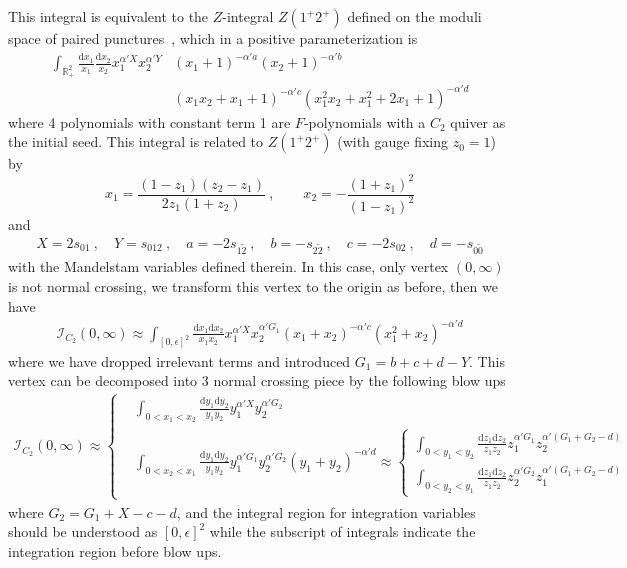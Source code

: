 \documentclass[12pt]{article}
\theoremstyle{definition}
\theoremstyle{plain}
\newcommand{\dif}{\mathrm{d}} %
\begin{document}
This integral is equivalent to the $Z$-integral $Z(1^{+}2^{+})$ defined on the moduli space of paired punctures~\cite{Li:2018mnq}, which in a positive parameterization is 
\begin{align*}
\int_{\mathbb R_+^2} \frac{\dif x_1}{x_1}\frac{\dif x_2}{x_2}x_1^{\alpha' X}x_2^{\alpha' Y}
&(x_1 + 1)^{-\alpha' a} 
(x_2 + 1)^{-\alpha' b}\\
&(x_1x_2 + x_1 + 1)^{-\alpha' c}
(x_1^2x_2 + x_1^2 + 2x_1 + 1)^{-\alpha' d} 
\end{align*}
where 4 polynomials with constant term 1 are $F$-polynomials with a $C_{2}$ quiver as the initial seed.
This integral is related to $Z(1^{+}2^{+})$ (with gauge fixing $z_{0}=1$) by 
\begin{equation*}
	x_{1}=\frac{(1-z_{1})(z_{2}-z_{1})}{2z_{1}(1+z_{2})} \:,\qquad x_{2}=-\frac{(1+z_{1})^{2}}{(1-z_{1})^{2}}
\end{equation*}
and
\begin{align*}
	X=2s_{01}\:,\quad Y=s_{012}\:,\quad a=-2s_{1\tilde{2}}\:,\quad b=-s_{2\tilde{2}}\:,\quad 
	c=-2s_{02}\:,\quad d=-s_{0\tilde{0}}
\end{align*}
with the Mandelstam variables defined therein. In this case, only vertex $(0,\infty)$ is not normal crossing, we transform this vertex to the origin as before, then we have
\begin{align*}
	\mathcal{I}_{C_{2}}(0,\infty)\approx \int_{[0,\epsilon]^{2}} \frac{\dif x_{1}\dif x_{2}}{x_{1}x_{2}} x_{1}^{\alpha' X}x_{2}^{\alpha' G_{1}}
	(x_{1}+x_{2})^{-\alpha' c} (x_{1}^{2}+x_{2})^{-\alpha' d}
\end{align*}
where we have dropped irrelevant terms and introduced $G_{1}=b+c+d-Y$. This vertex can be decomposed into 3 normal crossing piece by the following blow ups
\begin{align*}
	\mathcal{I}_{C_{2}}(0,\infty)\approx\left\{
	\begin{aligned}
		&\int_{0<x_{1}<x_{2}}\frac{\dif y_{1}\dif y_{2}}{y_{1}y_{2}} y_{1}^{\alpha' X}y_{2}^{\alpha' G_{2}} \\
		&\int_{0<x_{2}<x_{1}}\frac{\dif y_{1}\dif y_{2}}{y_{1}y_{2}} y_{1}^{\alpha' G_{1}}y_{2}^{\alpha' G_{2}}(y_{1}+y_{2})^{-\alpha'd} \approx
		\left\{\begin{aligned}
			\int_{0<y_{1}<y_{2}}\frac{\dif z_{1} \dif z_{2}}{z_{1}z_{2}}z_{1}^{\alpha' G_{1}}
			z_{2}^{\alpha'(G_{1}+G_{2}-d)} \\
			\int_{0<y_{2}<y_{1}}\frac{\dif z_{1}\dif z_{2}}{z_{1}z_{2}} z_{2}^{\alpha' G_{2}}
			z_{1}^{\alpha'(G_{1}+G_{2}-d)}
		\end{aligned} \right. 
	\end{aligned} \right.
\end{align*}
where $G_{2}=G_{1}+X-c-d$, and the integral region for integration variables should be understood as $[0,\epsilon]^{2}$ while the subscript of integrals indicate the integration region before blow ups.
\end{document}
